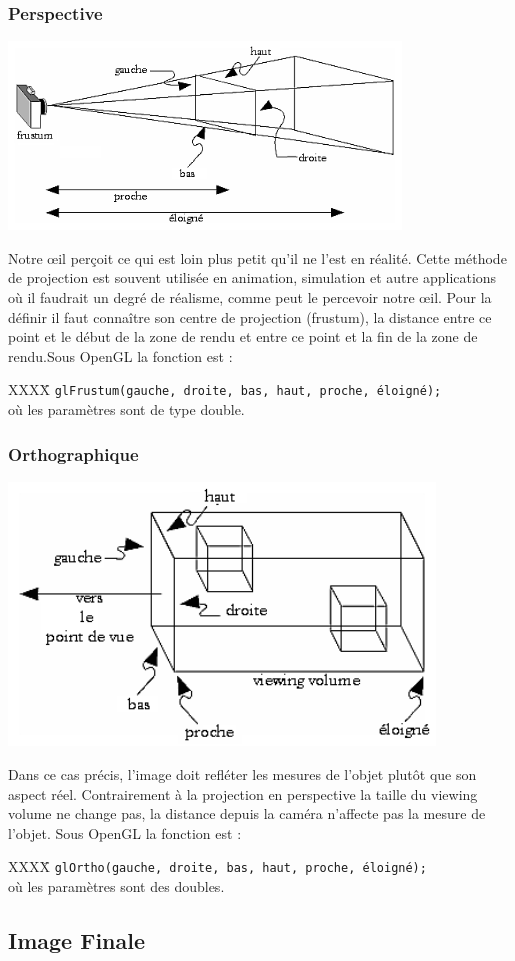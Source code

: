 \subsubsection{Perspective}
\begin{center}
	 \includegraphics[height=5cm]{img/Perspective}
 \end{center}
Notre œil perçoit ce qui est loin plus petit qu’il ne l’est en réalité. Cette méthode de projection est souvent utilisée en animation, simulation et autre applications où il faudrait un degré de réalisme, comme peut le percevoir notre œil. Pour la définir il faut connaître son centre de projection (frustum), la distance entre ce point et le début de la zone de rendu et entre ce point et la fin de la zone de rendu.Sous OpenGL la fonction est : 
\begin{tabbing}
XXXX\= \kill
\> \verb|glFrustum(gauche, droite, bas, haut, proche, éloigné);| \\où les paramètres sont de type double.
\end{tabbing}


\subsubsection{Orthographique}
\begin{center}
	 \includegraphics[height=7cm]{img/Ortho}
 \end{center}
Dans ce cas précis, l’image doit refléter les mesures de l’objet plutôt que son aspect réel. Contrairement à la projection en perspective la taille du viewing volume ne change pas, la distance depuis la caméra n’affecte pas la mesure de l’objet. Sous OpenGL la fonction est : 
\begin{tabbing}
XXXX\= \kill
\> \verb|glOrtho(gauche, droite, bas, haut, proche, éloigné);| \\où les paramètres sont des doubles.
\end{tabbing}

\subsection{Image Finale}


\newpage